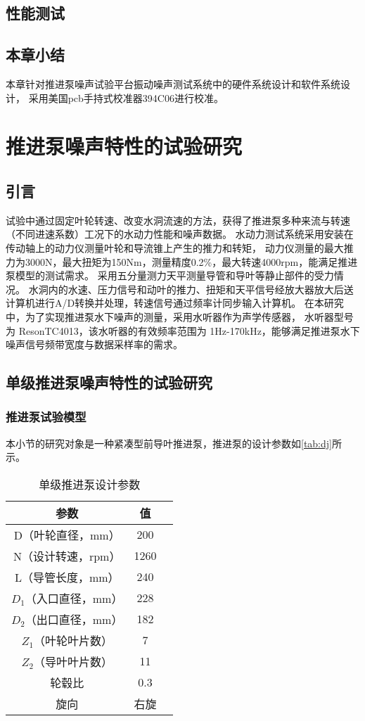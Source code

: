 \section{性能测试}
\section{本章小结}
本章针对推进泵噪声试验平台振动噪声测试系统中的硬件系统设计和软件系统设计，
采用美国pcb手持式校准器394C06进行校准。

\chapter{推进泵噪声特性的试验研究}\label{ch:chapter3}
\section{引言}


试验中通过固定叶轮转速、改变水洞流速的方法，获得了推进泵多种来流与转速（不同进速系数）工况下的水动力性能和噪声数据。
水动力测试系统采用安装在传动轴上的动力仪测量叶轮和导流锥上产生的推力和转矩，
动力仪测量的最大推力为3000N，最大扭矩为150Nm，测量精度0.2\%，最大转速4000rpm，能满足推进泵模型的测试需求。
采用五分量测力天平测量导管和导叶等静止部件的受力情况。
水洞内的水速、压力信号和动叶的推力、扭矩和天平信号经放大器放大后送计算机进行A/D转换并处理，转速信号通过频率计同步输入计算机。
在本研究中，为了实现推进泵水下噪声的测量，采用水听器作为声学传感器，
水听器型号为 ResonTC4013，该水听器的有效频率范围为 1Hz-170kHz，能够满足推进泵水下噪声信号频带宽度与数据采样率的需求。

\section{单级推进泵噪声特性的试验研究}
\subsection{推进泵试验模型}
本小节的研究对象是一种紧凑型前导叶推进泵，推进泵的设计参数如\autoref{tab:dj}所示。
\begin{table}[htbp]
    \centering
    \caption{\label{tab:dj}单级推进泵设计参数}
    \begin{tabular}{ccc}
     \toprule
     参数&值\\
     \midrule
     D（叶轮直径，mm）&200\\
     N（设计转速，rpm）&1260\\
     L（导管长度，mm）&240\\
     $D_1$（入口直径，mm）&228\\
     $D_2$（出口直径，mm）&182\\
     $Z_1$（叶轮叶片数）&7\\
     $Z_2$（导叶叶片数）&11\\
     轮毂比&0.3\\
     旋向&右旋\\
     \bottomrule
    \end{tabular}
\end{table}

